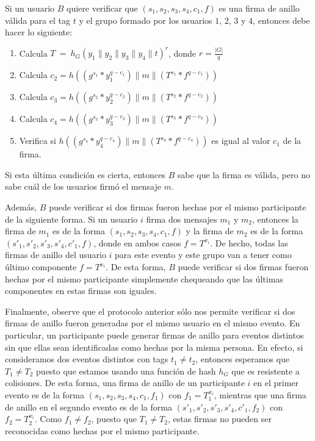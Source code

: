 Si un usuario $B$ quiere verificar que $(s_1, s_2, s_3, s_4, c_1, f)$ es una firma
de anillo válida para el tag $t$ y el grupo formado por los usuarios $1$, $2$, $3$ y $4$, entonces debe hacer lo siguiente:
\begin{enumerate}
	\item Calcula $T \ = \ h_G(y_1 \| y_2 \| y_3 \| y_4 \| t)^r$, donde $r = \frac{|G|}{q}$
	\item Calcula $c_2=h((g^{s_1} * y_1^{q - c_1}) \| m \| (T^{s_1} * f^{q - c_1}))$
	\item Calcula $c_3=h((g^{s_2} * y_2^{q - c_2}) \| m \| (T^{s_2} * f^{q - c_2}))$
	\item Calcula $c_4=h((g^{s_3} * y_3^{q - c_3}) \| m \| (T^{s_3} * f^{q - c_3}))$
	\item Verifica si $h((g^{s_4} * y_4^{q - c_4}) \| m \| (T^{s_4} * f^{q - c_4}))$
	es igual al valor $c_1$ de la firma.
\end{enumerate}
Si esta última condición es cierta, entonces $B$ sabe
que la firma es válida, pero no sabe cuál de los usuarios firmó el
mensaje $m$.

Además, $B$ puede verificar si dos firmas fueron hechas por el mismo participante de la siguiente forma.
Si un usuario $i$ firma dos mensajes $m_1$ y $m_2$, entonces la firma de $m_1$
es de la forma $(s_1, s_2, s_3, s_4, c_1, f)$ y la firma de $m_2$ es de la forma
$(s'_1, s'_2, s'_3, s'_4, c'_1, f)$, donde en ambos casos $f =  T^{x_i}$. De hecho, todas las firmas de anillo
del usuario $i$ para este evento y este grupo van a tener como último componente $f = T^{x_i}$. De esta forma, $B$ puede
verificar si dos firmas fueron hechas por el mismo participante simplemente chequeando que las últimas
componentes en estas firmas son iguales.

Finalmente, observe que el protocolo anterior sólo nos permite verificar si dos firmas de anillo fueron generadas
por el mismo usuario en el mismo evento. En particular,
un participante puede generar firmas de anillo para eventos distintos sin que ellas sean identificadas como hechas
por la misma persona. En efecto, si consideramos dos eventos
distintos con tags $t_1 \neq t_2$, entonces esperamos que $T_1 \neq T_2$ puesto que estamos usando
una función de hash $h_G$ que es resistente a colisiones. De esta forma, una firma de anillo de un participante $i$ en
el primer evento es de la forma $(s_1, s_2, s_3, s_4, c_1, f_1)$ con $f_1 = T_1^{x_i}$, mientras que una firma
de anillo en el segundo evento es de la forma $(s'_1, s'_2, s'_3, s'_4, c'_1, f_2)$ con $f_2 = T_2^{x_i}$.
Como $f_1 \neq f_2$, puesto que $T_1 \neq T_2$, estas firmas no pueden ser reconocidas como hechas por
el mismo participante.
